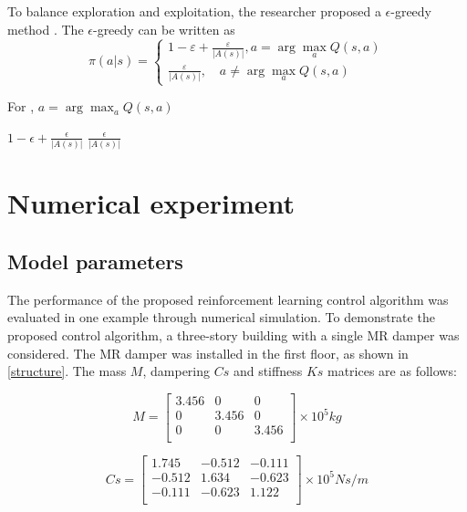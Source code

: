 To balance exploration and exploitation, the researcher proposed a $\epsilon$-greedy method \citep{}. The $\epsilon$-greedy can be written as
\begin{equation}
\pi(a | s)=\left\{\begin{array}{c}
{1-\varepsilon+\frac{\varepsilon}{|A(s)|}, a=\arg \max _{a} Q(s, a)} \\
{\frac{\varepsilon}{|A(s)|}, \quad a \neq \arg \max _{a} Q(s, a)}
\end{array}\right.
\end{equation}

For ,
$a=\arg \max _{a} Q(s, a)$

$1- \epsilon + \frac{\epsilon}{|A(s)|}$
$\frac{\epsilon}{|A(s)|}$

\section{Numerical experiment}
\subsection{Model parameters}
The performance of the proposed reinforcement learning control algorithm was evaluated in one example through numerical simulation. To demonstrate the proposed control algorithm, a three-story building with a single MR damper was considered. The MR damper was installed in the first floor, as shown in \ref{structure}. The mass $M$, dampering $Cs$ and stiffness $Ks$ matrices are as follows:

\begin{equation}       
M=\left[                 
  \begin{array}{ccc}   
   3.456 & 0 & 0 \\  
    0 & 3.456 & 0 \\ 
   0 & 0 &  3.456 \\
  \end{array}
\right]     
\times 10^{5} kg        
\end{equation}

\begin{equation}       
Cs=\left[                 
  \begin{array}{ccc}   
    1.745 & -0.512 & -0.111\\
    -0.512 & 1.634 & -0.623 \\
    -0.111 & -0.623 & 1.122 \\
  \end{array}
\right]     
\times 10^{5} N s/m        
\end{equation}

